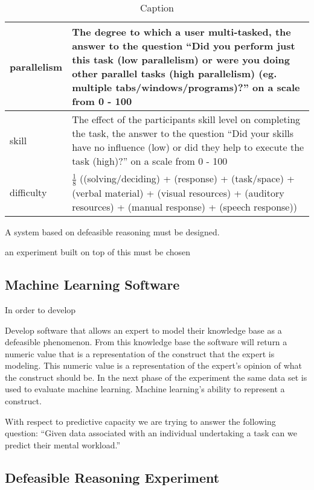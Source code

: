 \begin{table}[]
\begin{tabular}{|l|p{8cm}|}
 parallelism & The degree to which a user multi-tasked, the answer to the question ``Did you perform just this task (low parallelism) or were you doing other parallel tasks (high parallelism) (eg. multiple tabs/windows/programs)?'' on a scale from 0 - 100 \\ \hline
 skill & The effect of the participants skill level on completing the task, the answer to the question ``Did your skills have no influence (low) or did they help to execute the task (high)?'' on a scale from 0 - 100 \\ \hline
 difficulty & \( \frac{1}{8} \) ((solving/deciding) + (response) + (task/space) + (verbal material) + (visual resources) + (auditory resources) + (manual response) + (speech response)) \\ \hline
 
\end{tabular}
\caption{Caption}
\label{tab:my_label}
\end{table}


  \item A system based on defeasible reasoning must be designed.
  \item an experiment built on top of this must be chosen 

\subsection{Machine Learning Software}

In order to develop 





Develop software that allows an expert to model their knowledge base as a defeasible phenomenon. From this knowledge base the software will return a numeric value that is a representation of the construct that the expert is modeling. This numeric value is a representation of the expert's opinion of what the construct should be.
In the next phase of the experiment the same data set is used to evaluate machine learning. Machine learning's ability to represent a construct.


With respect to predictive capacity we are trying to answer the following question: ``Given data associated with an individual undertaking a task can we predict their mental workload.''








\subsection{Defeasible Reasoning Experiment}


